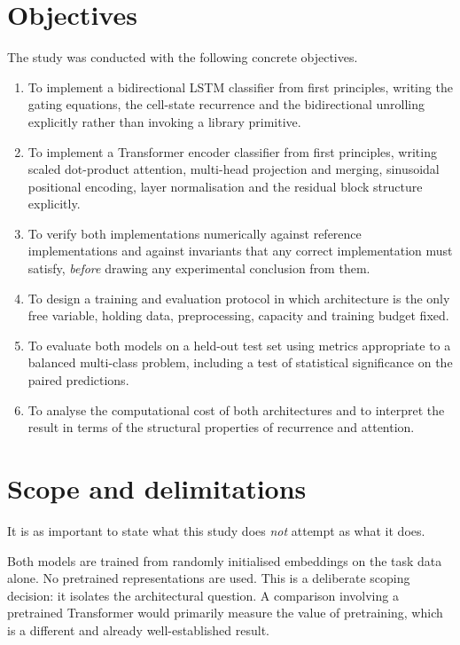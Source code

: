 \section{Objectives}

The study was conducted with the following concrete objectives.

\begin{enumerate}
\item To implement a bidirectional LSTM classifier from first principles, writing the gating
      equations, the cell-state recurrence and the bidirectional unrolling explicitly rather than
      invoking a library primitive.
\item To implement a Transformer encoder classifier from first principles, writing scaled
      dot-product attention, multi-head projection and merging, sinusoidal positional encoding,
      layer normalisation and the residual block structure explicitly.
\item To verify both implementations numerically against reference implementations and against
      invariants that any correct implementation must satisfy, \emph{before} drawing any
      experimental conclusion from them.
\item To design a training and evaluation protocol in which architecture is the only free
      variable, holding data, preprocessing, capacity and training budget fixed.
\item To evaluate both models on a held-out test set using metrics appropriate to a balanced
      multi-class problem, including a test of statistical significance on the paired predictions.
\item To analyse the computational cost of both architectures and to interpret the result in terms
      of the structural properties of recurrence and attention.
\end{enumerate}

\section{Scope and delimitations}

It is as important to state what this study does \emph{not} attempt as what it does.

 Both models are trained from randomly
initialised embeddings on the task data alone. No pretrained representations are used. This is a
deliberate scoping decision: it isolates the architectural question. A comparison involving a
pretrained Transformer would primarily measure the value of pretraining, which is a different and
already well-established result.

